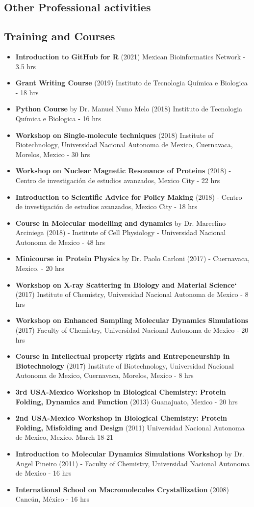 \documentclass[letterpaper,11pt]{article}
\begin{document}
\subsection*{Other Professional activities}
\subsection*{Training and Courses}
\begin{itemize}
\item \textbf{Introduction to GitHub for R} (2021) Mexican Bioinformatics Network - 3.5 hrs
\item \textbf{Grant Writing Course} (2019) Instituto de Tecnologia Química e Biologica - 18 hrs
\item \textbf{Python Course} by Dr. Manuel Nuno Melo (2018) Instituto de Tecnologia Química e Biologica - 16 hrs
\item \textbf{Workshop on Single-molecule techniques} (2018) Institute of Biotechnology, Universidad Nacional Autonoma de Mexico, Cuernavaca, Morelos, Mexico - 30 hrs 
\item \textbf{Workshop on Nuclear Magnetic Resonance of Proteins} (2018) - Centro de investigación de estudios avanzados, Mexico City - 22 hrs
\item \textbf{Introduction to Scientific Advice for Policy Making} (2018) - Centro de investigación de estudios avanzados, Mexico City - 18 hrs
\item \textbf{Course in Molecular modelling and dynamics} by Dr. Marcelino Arciniega (2018) - Institute of Cell Physiology - Universidad Nacional Autonoma de Mexico - 48 hrs 
\item \textbf{Minicourse in Protein Physics} by Dr. Paolo Carloni (2017) - Cuernavaca, Mexico. - 20 hrs
\item \textbf{Workshop on X-ray Scattering in Biology and Material Science`} (2017) Institute of Chemistry, Universidad Nacional Autonoma de Mexico - 8 hrs
\item \textbf{Workshop on Enhanced Sampling Molecular Dynamics Simulations} (2017) Faculty of Chemistry, Universidad Nacional Autonoma de Mexico - 20 hrs
\item \textbf{Course in Intellectual property rights and Entrepeneurship in Biotechnology} (2017) Institute of Biotechnology, Universidad Nacional Autonoma de Mexico, Cuernavaca, Morelos, Mexico - 8 hrs 
\item \textbf{3rd USA-Mexico Workshop in Biological Chemistry: Protein Folding, Dynamics and Function} (2013) Guanajuato, Mexico - 20 hrs
\item \textbf{2nd USA-Mexico Workshop in Biological Chemistry: Protein Folding, Misfolding and Design} (2011) Universidad Nacional Autonoma de Mexico, Mexico. March 18-21
\item \textbf{Introduction to Molecular Dynamics Simulations Workshop} by Dr. Angel Pineiro (2011) - Faculty of Chemistry, Universidad Nacional Autonoma de Mexico - 16 hrs
\item \textbf{International School on Macromolecules Crystallization} (2008) Cancún, México - 16 hrs
\end{itemize}
\end{document}
